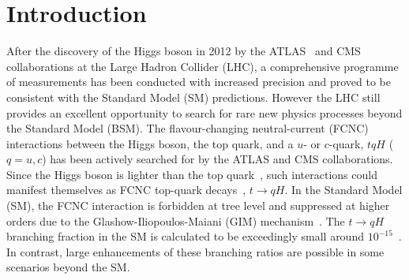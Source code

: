 \section{Introduction}
\label{sec:intro}
After the discovery of the Higgs boson in 2012 by the ATLAS~\cite{Aad:2012tfa} and CMS~\cite{Chatrchyan:2012ufa} collaborations at 
the Large Hadron Collider (LHC), a comprehensive programme of measurements %
has been conducted with increased precision and proved to be consistent with the Standard Model (SM) predictions. 
However the LHC still provides an excellent opportunity to search for rare new physics processes beyond the Standard Model (BSM).  
The flavour-changing neutral-current (FCNC) interactions 
between the Higgs boson, the top quark, and a $u$- or $c$-quark, $tqH$ ($q=u,c$) has been actively searched for by the ATLAS and CMS collaborations.
Since the Higgs boson is lighter than the top quark~\cite{Aad:2015zhl},
such interactions could manifest themselves as FCNC top-quark decays~\cite{Agashe:2013hma}, $t\to qH$.  
In the Standard Model (SM), the FCNC interaction is forbidden at tree level and suppressed at higher orders due to the Glashow-Iliopoulos-Maiani (GIM) mechanism~\cite{Glashow:1970gm}. The $t\to qH$ branching fraction in the SM is calculated to be exceedingly small around $10^{-15}$~\cite{Eilam:1990zc,Mele:1998ag,AguilarSaavedra:2004wm,Zhang:2013xya}. 
In contrast, large enhancements of these branching ratios are possible in some scenarios beyond the SM.
